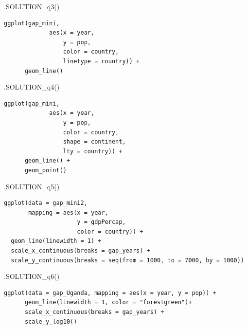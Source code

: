\documentclass[
  letterpaper,
  DIV=11,
  numbers=noendperiod]{scrreprt}
\newenvironment{Shaded}{\begin{snugshade}}{\end{snugshade}}
\newcommand{\FunctionTok}[1]{\textcolor[rgb]{0.28,0.35,0.67}{#1}}
\newcommand{\NormalTok}[1]{\textcolor[rgb]{0.00,0.23,0.31}{#1}}
\begin{document}
\begin{Shaded}
\begin{Highlighting}[]
\FunctionTok{.SOLUTION\_q3}\NormalTok{()}
\end{Highlighting}
\end{Shaded}

\begin{verbatim}
ggplot(gap_mini,
             aes(x = year,
                 y = pop,
                 color = country,
                 linetype = country)) +
      geom_line()
\end{verbatim}

\begin{Shaded}
\begin{Highlighting}[]
\FunctionTok{.SOLUTION\_q4}\NormalTok{()}
\end{Highlighting}
\end{Shaded}

\begin{verbatim}
ggplot(gap_mini,
             aes(x = year,
                 y = pop,
                 color = country,
                 shape = continent,
                 lty = country)) +
      geom_line() +
      geom_point()
\end{verbatim}

\begin{Shaded}
\begin{Highlighting}[]
\FunctionTok{.SOLUTION\_q5}\NormalTok{()}
\end{Highlighting}
\end{Shaded}

\begin{verbatim}
ggplot(data = gap_mini2, 
       mapping = aes(x = year, 
                     y = gdpPercap, 
                     color = country)) +
  geom_line(linewidth = 1) +
  scale_x_continuous(breaks = gap_years) +
  scale_y_continuous(breaks = seq(from = 1000, to = 7000, by = 1000))
\end{verbatim}

\begin{Shaded}
\begin{Highlighting}[]
\FunctionTok{.SOLUTION\_q6}\NormalTok{()}
\end{Highlighting}
\end{Shaded}

\begin{verbatim}
ggplot(data = gap_Uganda, mapping = aes(x = year, y = pop)) + 
      geom_line(linewidth = 1, color = "forestgreen")+
      scale_x_continuous(breaks = gap_years) +
      scale_y_log10()
\end{verbatim}
\end{document}
